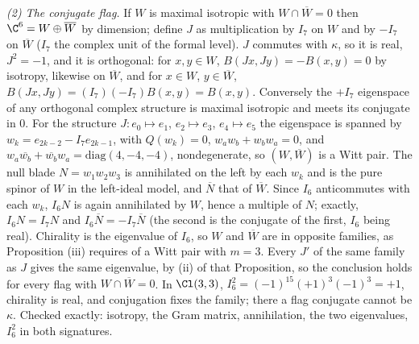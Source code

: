 \emph{(2) The conjugate flag.} If $W$ is maximal isotropic with $W \cap \overline W = 0$ then $\C^6 = W \oplus \overline W$ by dimension; define $J$ as multiplication by $I_7$ on $W$ and by $-I_7$ on $\overline W$ ($I_7$ the complex unit of the formal level). $J$ commutes with $\kappa$, so it is real, $J^2 = -1$, and it is orthogonal: for $x, y \in W$, $B(Jx,Jy) = -B(x,y) = 0$ by isotropy, likewise on $\overline W$, and for $x \in W$, $y \in \overline W$, $B(Jx,Jy) = (I_7)(-I_7)B(x,y) = B(x,y)$. Conversely the $+I_7$ eigenspace of any orthogonal complex structure is maximal isotropic and meets its conjugate in $0$. For the structure $J: e_0 \mapsto e_1$, $e_2 \mapsto e_3$, $e_4 \mapsto e_5$ the eigenspace is spanned by $w_k = e_{2k-2} - I_7e_{2k-1}$, with $Q(w_k) = 0$, $w_aw_b + w_bw_a = 0$, and $w_a\overline{w_b} + \overline{w_b}w_a = \mathrm{diag}(4,-4,-4)$, nondegenerate, so $(W, \overline W)$ is a Witt pair. The null blade $N = w_1w_2w_3$ is annihilated on the left by each $w_k$ and is the pure spinor of $W$ in the left-ideal model, and $\overline N$ that of $\overline W$. Since $I_6$ anticommutes with each $w_k$, $I_6N$ is again annihilated by $W$, hence a multiple of $N$; exactly, $I_6 N = I_7N$ and $I_6\overline N = -I_7\overline N$ (the second is the conjugate of the first, $I_6$ being real). Chirality is the eigenvalue of $I_6$, so $W$ and $\overline W$ are in opposite families, as Proposition (iii) requires of a Witt pair with $m = 3$. Every $J'$ of the same family as $J$ gives the same eigenvalue, by (ii) of that Proposition, so the conclusion holds for every flag with $W\cap\overline W = 0$. In $\Cl(3,3)$, $I_6^2 = (-1)^{15}(+1)^3(-1)^3 = +1$, chirality is real, and conjugation fixes the family; there a flag conjugate cannot be $\kappa$. Checked exactly: isotropy, the Gram matrix, annihilation, the two eigenvalues, $I_6^2$ in both signatures.

